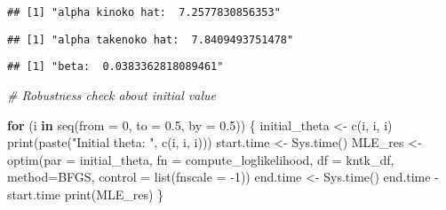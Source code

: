 \documentclass[
]{article}
\newenvironment{Shaded}{\begin{snugshade}}{\end{snugshade}}
\newcommand{\AttributeTok}[1]{\textcolor[rgb]{0.77,0.63,0.00}{#1}}
\newcommand{\CommentTok}[1]{\textcolor[rgb]{0.56,0.35,0.01}{\textit{#1}}}
\newcommand{\ControlFlowTok}[1]{\textcolor[rgb]{0.13,0.29,0.53}{\textbf{#1}}}
\newcommand{\DecValTok}[1]{\textcolor[rgb]{0.00,0.00,0.81}{#1}}
\newcommand{\FloatTok}[1]{\textcolor[rgb]{0.00,0.00,0.81}{#1}}
\newcommand{\FunctionTok}[1]{\textcolor[rgb]{0.00,0.00,0.00}{#1}}
\newcommand{\NormalTok}[1]{#1}
\newcommand{\OtherTok}[1]{\textcolor[rgb]{0.56,0.35,0.01}{#1}}
\newcommand{\SpecialCharTok}[1]{\textcolor[rgb]{0.00,0.00,0.00}{#1}}
\newcommand{\StringTok}[1]{\textcolor[rgb]{0.31,0.60,0.02}{#1}}
\begin{document}
\begin{verbatim}
## [1] "alpha kinoko hat:  7.2577830856353"
\end{verbatim}

\begin{Shaded}
\end{Shaded}

\begin{verbatim}
## [1] "alpha takenoko hat:  7.8409493751478"
\end{verbatim}

\begin{Shaded}
\end{Shaded}

\begin{verbatim}
## [1] "beta:  0.0383362818089461"
\end{verbatim}

\begin{Shaded}
\begin{Highlighting}[]
\CommentTok{\# Robustness check about initial value}

\ControlFlowTok{for}\NormalTok{ (i }\ControlFlowTok{in} \FunctionTok{seq}\NormalTok{(}\AttributeTok{from =} \DecValTok{0}\NormalTok{, }\AttributeTok{to =} \FloatTok{0.5}\NormalTok{, }\AttributeTok{by =} \FloatTok{0.5}\NormalTok{)) \{}
\NormalTok{  initial\_theta }\OtherTok{\textless{}{-}} \FunctionTok{c}\NormalTok{(i, i, i)}
  \FunctionTok{print}\NormalTok{(}\FunctionTok{paste}\NormalTok{(}\StringTok{"Initial theta: "}\NormalTok{, }\FunctionTok{c}\NormalTok{(i, i, i)))}
\NormalTok{  start.time }\OtherTok{\textless{}{-}} \FunctionTok{Sys.time}\NormalTok{()}
\NormalTok{  MLE\_res }\OtherTok{\textless{}{-}} \FunctionTok{optim}\NormalTok{(}\AttributeTok{par =}\NormalTok{ initial\_theta, }\AttributeTok{fn =}\NormalTok{ compute\_loglikelihood, }\AttributeTok{df =}\NormalTok{ kntk\_df, }\AttributeTok{method=}\StringTok{\textquotesingle{}BFGS\textquotesingle{}}\NormalTok{, }\AttributeTok{control =} \FunctionTok{list}\NormalTok{(}\AttributeTok{fnscale =} \SpecialCharTok{{-}}\DecValTok{1}\NormalTok{))}
\NormalTok{  end.time }\OtherTok{\textless{}{-}} \FunctionTok{Sys.time}\NormalTok{()}
\NormalTok{  end.time }\SpecialCharTok{{-}}\NormalTok{ start.time}
  \FunctionTok{print}\NormalTok{(MLE\_res)}
\NormalTok{\}}
\end{Highlighting}
\end{Shaded}
\end{document}
